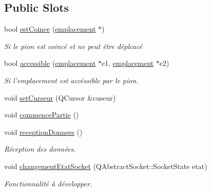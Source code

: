 \subsection*{Public Slots}
\begin{DoxyCompactItemize}
\item 
\hypertarget{class_main_window_a4ae4ac96dbfdcb80facbf7da0ae3fb5e}{bool \hyperlink{class_main_window_a4ae4ac96dbfdcb80facbf7da0ae3fb5e}{est\-Coince} (\hyperlink{classemplacement}{emplacement} $\ast$)}\label{class_main_window_a4ae4ac96dbfdcb80facbf7da0ae3fb5e}

\begin{DoxyCompactList}\small\item\em Si le pion est coincé et ne peut être déplcacé \end{DoxyCompactList}\item 
bool \hyperlink{class_main_window_ac3a2c00ad936408dce78d15697eeef24}{accessible} (\hyperlink{classemplacement}{emplacement} $\ast$e1, \hyperlink{classemplacement}{emplacement} $\ast$e2)
\begin{DoxyCompactList}\small\item\em Si l'emplacement est accéssible par le pion. \end{DoxyCompactList}\item 
void \hyperlink{class_main_window_a8e9fb499b85eef1d31b4caedcdad3424}{set\-Curseur} (Q\-Cursor \&cuseur)
\item 
void \hyperlink{class_main_window_aa423b534c9d408e59a52f6e7644ccdcb}{commence\-Partie} ()
\item 
void \hyperlink{class_main_window_acb2efdb6b0b137cf2e44d6bd2fbb3aec}{reception\-Donnees} ()
\begin{DoxyCompactList}\small\item\em Réception des données. \end{DoxyCompactList}\item 
\hypertarget{class_main_window_a52d0b54e86461bd0f4738921651c15a2}{void \hyperlink{class_main_window_a52d0b54e86461bd0f4738921651c15a2}{changement\-Etat\-Socket} (Q\-Abstract\-Socket\-::\-Socket\-State etat)}\label{class_main_window_a52d0b54e86461bd0f4738921651c15a2}

\begin{DoxyCompactList}\small\item\em Fonctionnalité à développer. \end{DoxyCompactList}\end{DoxyCompactItemize}
